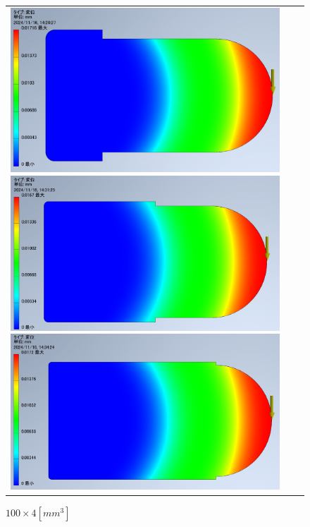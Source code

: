   \begin{figure}[H]
    \begin{tabular}{ccc}
      \begin{minipage}{.25\textwidth}
        \centering
        \includegraphics[width=0.99\linewidth]{images/4-3_disp.png}
        \caption{$50\times8[mm^3]$}
        \label{img:4-3_disp}
      \end{minipage}
      \begin{minipage}{.25\textwidth}
        \centering
        \includegraphics[width=0.99\linewidth]{images/4-6_disp.png}
        \caption{$100\times4[mm^3]$}
        \label{img:4-7_disp}
      \end{minipage}
      \begin{minipage}{.25\textwidth}
        \centering
        \includegraphics[width=0.99\linewidth]{images/4-7_disp.png}

\end{minipage}
\end{tabular}
\end{figure}
